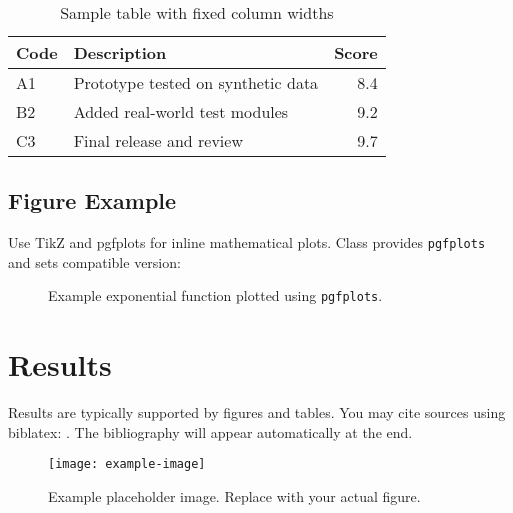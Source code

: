 \documentclass{manuscript_modern}
\begin{document}
\begin{maintext}
		\lipsum[4]
		
		\begin{table}[ht]
			\centering
			\caption{Sample table with fixed column widths}
			\begin{tabularx}{0.9\textwidth}{lXr}
				\toprule
				\textbf{Code} & \textbf{Description} & \textbf{Score} \\
				\midrule
				A1 & Prototype tested on synthetic data & 8.4 \\
				B2 & Added real-world test modules & 9.2 \\
				C3 & Final release and review & 9.7 \\
				\bottomrule
			\end{tabularx}
		\end{table}
		
		\lipsum[2]
		\subsection{Figure Example}
		Use TikZ and pgfplots for inline mathematical plots. Class provides \texttt{pgfplots} and sets compatible version:
		
		
		\begin{figure}[ht]
			\centering
			\caption{Example exponential function plotted using \texttt{pgfplots}.}
		\end{figure}

	
	\section{Results}

		Results are typically supported by figures and tables. You may cite sources using biblatex: \cite{grinsteinSteeredResponsePower2024, wajidDesignAnalysisAir2016}. The bibliography will appear automatically at the end.
		
		\begin{figure}[ht]
			\centering
			\texttt{[image: example-image]}
			\caption{Example placeholder image. Replace with your actual figure.}
			\label{fig:example}
		\end{figure}


\end{maintext}
\end{document}
